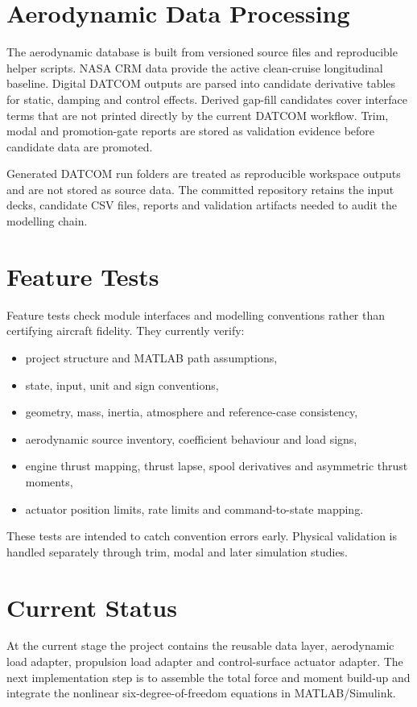 \section{Aerodynamic Data Processing}

The aerodynamic database is built from versioned source files and reproducible
helper scripts. NASA CRM data provide the active clean-cruise longitudinal
baseline. Digital DATCOM outputs are parsed into candidate derivative tables
for static, damping and control effects. Derived gap-fill candidates cover
interface terms that are not printed directly by the current DATCOM workflow.
Trim, modal and promotion-gate reports are stored as validation evidence before
candidate data are promoted.

Generated DATCOM run folders are treated as reproducible workspace outputs and
are not stored as source data. The committed repository retains the input
decks, candidate CSV files, reports and validation artifacts needed to audit
the modelling chain.

\section{Feature Tests}

Feature tests check module interfaces and modelling conventions rather than
certifying aircraft fidelity. They currently verify:
\begin{itemize}
    \item project structure and MATLAB path assumptions,
    \item state, input, unit and sign conventions,
    \item geometry, mass, inertia, atmosphere and reference-case consistency,
    \item aerodynamic source inventory, coefficient behaviour and load signs,
    \item engine thrust mapping, thrust lapse, spool derivatives and asymmetric
    thrust moments,
    \item actuator position limits, rate limits and command-to-state mapping.
\end{itemize}

These tests are intended to catch convention errors early. Physical validation
is handled separately through trim, modal and later simulation studies.

\section{Current Status}

At the current stage the project contains the reusable data layer, aerodynamic
load adapter, propulsion load adapter and control-surface actuator adapter. The
next implementation step is to assemble the total force and moment build-up and
integrate the nonlinear six-degree-of-freedom equations in MATLAB/Simulink.
